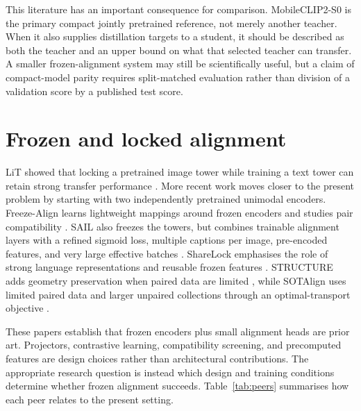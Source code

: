 \documentclass[11pt,a4paper,oneside]{report}
\begin{document}
This literature has an important consequence for comparison. MobileCLIP2-S0 is
the primary compact jointly pretrained reference, not merely another teacher.
When it also supplies distillation targets to a student, it should be described
as both the teacher and an upper bound on what that selected teacher can
transfer. A smaller frozen-alignment system may still be scientifically useful,
but a claim of compact-model parity requires split-matched evaluation rather
than division of a validation score by a published test score.

\section{Frozen and locked alignment}

LiT showed that locking a pretrained image tower while training a text tower can
retain strong transfer performance \cite{zhai2022lit}. More recent work moves
closer to the present problem by starting with two independently pretrained
unimodal encoders. Freeze-Align learns lightweight mappings around frozen
encoders and studies pair compatibility \cite{maniparambil2025freezealign}.
SAIL also freezes the towers, but combines trainable alignment layers with a
refined sigmoid loss, multiple captions per image, pre-encoded features, and
very large effective batches \cite{zhang2025sail}. ShareLock emphasises the role
of strong language representations and reusable frozen features
\cite{ruthardt2026sharelock}. STRUCTURE adds geometry preservation when paired
data are limited \cite{groger2025structure}, while SOTAlign uses limited paired
data and larger unpaired collections through an optimal-transport objective
\cite{roschmann2026sotalign}.

These papers establish that frozen encoders plus small alignment heads are
prior art. Projectors, contrastive learning, compatibility screening, and
precomputed features are design choices rather than architectural
contributions. The appropriate research question is instead which design and
training conditions determine whether frozen alignment succeeds.
Table~\ref{tab:peers} summarises how each peer relates to the present setting.
\end{document}
